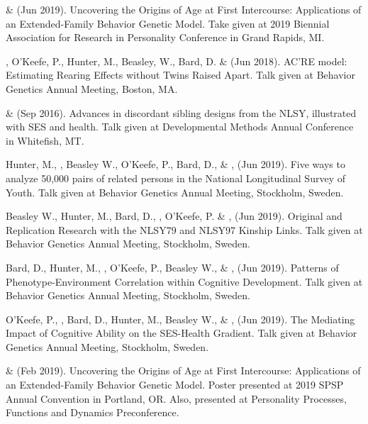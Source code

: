 \item \meb \& \Joe (Jun 2019). Uncovering the Origins of Age at First Intercourse: Applications of an Extended-Family Behavior Genetic Model. Take given at 2019 Biennial Association for Research in Personality Conference in Grand Rapids, MI.
\item\meb, O'Keefe, P., Hunter, M., Beasley, W., Bard, D. \& \Joe (Jun 2018). AC'RE model: Estimating Rearing Effects without Twins Raised Apart. Talk given at Behavior Genetics Annual Meeting, Boston, MA.

\item\meb \& \joe (Sep 2016). Advances in discordant sibling designs from the NLSY, illustrated with SES and health. Talk given at Developmental Methods Annual Conference in Whitefish, MT.\smallskip\\
%

\item Hunter, M., \meb, Beasley W., O'Keefe, P.,  Bard, D., \&   \Joe, (Jun 2019). Five ways to analyze 50,000 pairs of related persons in the National Longitudinal Survey of Youth. Talk given at Behavior Genetics Annual Meeting, Stockholm, Sweden. 

\item Beasley W., Hunter, M., Bard, D., \meb, O'Keefe, P. \&  \Joe, (Jun 2019). Original and Replication Research with the NLSY79 and NLSY97 Kinship Links. Talk given at Behavior Genetics Annual Meeting, Stockholm, Sweden. 

\item Bard, D., Hunter, M., \meb, O'Keefe, P., Beasley W.,  \&  \Joe, (Jun 2019). Patterns of Phenotype-Environment Correlation within Cognitive Development. Talk given at Behavior Genetics Annual Meeting, Stockholm, Sweden. 

\item O'Keefe, P., \meb, Bard, D., Hunter, M.,  Beasley W.,  \&  \Joe, (Jun 2019). The Mediating Impact of Cognitive Ability on the SES-Health Gradient. Talk given at Behavior Genetics Annual Meeting, Stockholm, Sweden. 


\item \meb \& \Joe (Feb 2019). Uncovering the Origins of Age at First Intercourse: Applications of an Extended-Family Behavior Genetic Model. Poster presented at 2019 SPSP Annual Convention in Portland, OR. Also, presented at Personality Processes, Functions and Dynamics Preconference.



